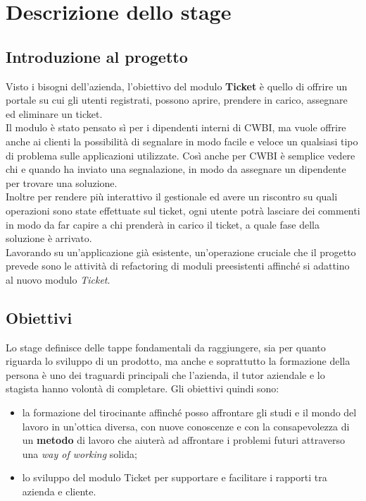 \chapter{Descrizione dello stage}
\label{cap:descrizione-stage}

\section{Introduzione al progetto}
Visto i bisogni dell'azienda, l'obiettivo del modulo \textbf{Ticket} è quello di offrire un portale su cui gli utenti registrati, possono aprire, prendere in carico, assegnare ed eliminare un ticket. \\
Il modulo è stato pensato sì per i dipendenti interni di CWBI, ma vuole offrire anche ai clienti la possibilità di segnalare in modo facile e veloce un qualsiasi tipo di problema sulle applicazioni utilizzate. Così anche per CWBI è semplice vedere chi e quando ha inviato una segnalazione, in modo da assegnare un dipendente per trovare una soluzione.\\ 
Inoltre per rendere più interattivo il gestionale ed avere un riscontro su quali operazioni sono state effettuate sul ticket, ogni utente potrà lasciare dei commenti in modo da far capire a chi prenderà in carico il ticket, a quale fase della soluzione è arrivato.\\
Lavorando su un'applicazione già esistente, un'operazione cruciale che il progetto prevede sono le attività di refactoring di moduli preesistenti affinché si adattino al nuovo modulo \textit{Ticket}. 

\section{Obiettivi}
Lo stage definisce delle tappe fondamentali da raggiungere, sia per quanto riguarda lo sviluppo di un prodotto, ma anche e soprattutto la formazione della persona è uno dei traguardi principali che l'azienda, il tutor aziendale e lo stagista hanno volontà di completare. Gli obiettivi quindi sono:
\begin{itemize}
\item la formazione del tirocinante affinché posso affrontare gli studi e il mondo del lavoro in un'ottica diversa, con nuove conoscenze e con la consapevolezza di un \textbf{metodo} di lavoro che aiuterà ad affrontare i problemi futuri attraverso una \textit{way of working} solida;
\item lo sviluppo del modulo Ticket per supportare e facilitare i rapporti tra azienda e cliente.
\end{itemize}

